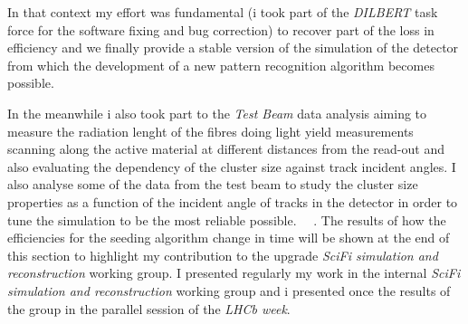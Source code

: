 \documentclass[paper=a4, fontsize=10pt]{scrartcl}
\numberwithin{equation}{section}		%
\numberwithin{figure}{section}			%
\numberwithin{table}{section}				%
\begin{document}
In that context my effort was fundamental (i took part of the \textit{DILBERT} task force for the software fixing and bug correction) to recover part of the loss in efficiency and we finally provide a stable version of the simulation of the detector from which the development of a new pattern recognition algorithm becomes possible. 

In the meanwhile i also took part to the \textit{Test Beam} data analysis aiming to measure the radiation lenght of the fibres doing light yield measurements scanning along the active material at different distances from the read-out and also evaluating the dependency of the cluster size against track incident angles. I also analyse some of the data from the test beam to study the cluster size properties as a function of the incident angle of tracks in the detector in order to tune the simulation to be the most reliable possible. ~\cite{AnalysisOrsay}~\cite{LalTestBeam}.
The results of how the efficiencies for the seeding algorithm change in time will be shown at the end of this section to highlight my contribution to the upgrade \textit{SciFi simulation and reconstruction} working group. I presented regularly my work in the internal \textit{SciFi simulation and reconstruction} working group and i presented once the results of the group in the parallel session of the \textit{LHCb week}. 
\end{document}
